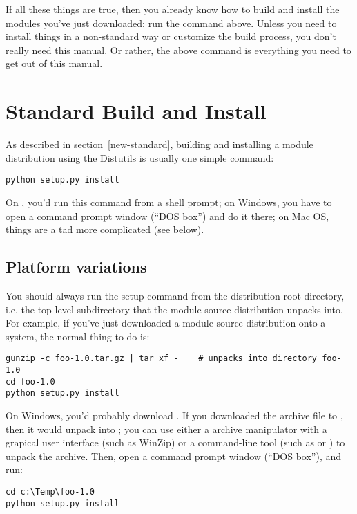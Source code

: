 \documentclass{howto}
\begin{document}
If all these things are true, then you already know how to build and
install the modules you've just downloaded: run the command above.
Unless you need to install things in a non-standard way or customize the
build process, you don't really need this manual.  Or rather, the above
command is everything you need to get out of this manual.


\section{Standard Build and Install}
\label{standard-install}

As described in section~\ref{new-standard}, building and installing
a module distribution using the Distutils is usually one simple command:

\begin{verbatim}
python setup.py install
\end{verbatim}

On \UNIX, you'd run this command from a shell prompt; on Windows, you
have to open a command prompt window (``DOS box'') and do it there; on
Mac OS, things are a tad more complicated (see below).


\subsection{Platform variations}
\label{platform-variations}

You should always run the setup command from the distribution root
directory, i.e. the top-level subdirectory that the module source
distribution unpacks into.  For example, if you've just downloaded a
module source distribution  onto a
\UNIX{} system, the normal thing to do is:

\begin{verbatim}
gunzip -c foo-1.0.tar.gz | tar xf -    # unpacks into directory foo-1.0
cd foo-1.0
python setup.py install
\end{verbatim}

On Windows, you'd probably download .  If you
downloaded the archive file to , then it
would unpack into ;
you can use either a archive manipulator with a grapical user interface
(such as WinZip) or a command-line tool (such as  or
) to unpack the archive.  Then, open a command prompt
window (``DOS box''), and run:

\begin{verbatim}
cd c:\Temp\foo-1.0
python setup.py install
\end{verbatim}
\end{document}
